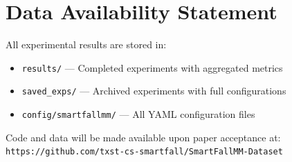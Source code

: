 \documentclass{article}
\begin{document}
\section{Data Availability Statement}

All experimental results are stored in:
\begin{itemize}
    \item \texttt{results/} --- Completed experiments with aggregated metrics
    \item \texttt{saved\_exps/} --- Archived experiments with full configurations
    \item \texttt{config/smartfallmm/} --- All YAML configuration files
\end{itemize}

Code and data will be made available upon paper acceptance at:\\
\texttt{https://github.com/txst-cs-smartfall/SmartFallMM-Dataset}
\end{document}
